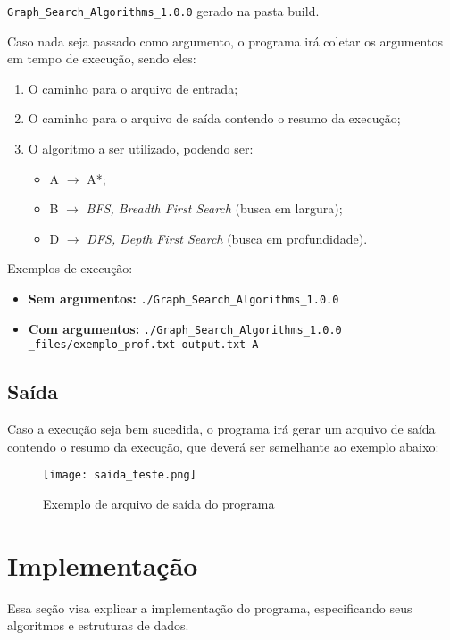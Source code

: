 \documentclass[12pt, a4paper]{article}
\begin{document}
\texttt{Graph\_Search\_Algorithms\_1.0.0} gerado na pasta build.

Caso nada seja passado como argumento, o programa irá coletar os argumentos em tempo de execução,
sendo eles:
\begin{enumerate}
    \item O caminho para o arquivo de entrada;
    \item O caminho para o arquivo de saída contendo o resumo da execução;
    \item O algoritmo a ser utilizado, podendo ser:
    \begin{itemize}
        \item A \( \rightarrow \) A*;
        \item B \( \rightarrow \) \textit{BFS, Breadth First Search} (busca em largura);
        \item D \( \rightarrow \) \textit{DFS, Depth First Search} (busca em profundidade).
    \end{itemize}
\end{enumerate}

Exemplos de execução:
\begin{itemize}
    \item\textbf{Sem argumentos:} \texttt{./Graph\_Search\_Algorithms\_1.0.0}
    \item\textbf{Com argumentos:} \texttt{./Graph\_Search\_Algorithms\_1.0.0\\_files/exemplo\_prof.txt output.txt A}
\end{itemize}

\subsection{Saída}\label{sec:saida}
Caso a execução seja bem sucedida, o programa irá gerar um arquivo de saída contendo o resumo da execução,
que deverá ser semelhante ao exemplo abaixo:
\begin{figure}[!h]
    \centering
    \texttt{[image: saida\_teste.png]}
    \caption{Exemplo de arquivo de saída do programa}
    \label{fig:saida_teste}
\end{figure}


\section{Implementação}\label{sec:impl}
Essa seção visa explicar a implementação do programa,
especificando seus algoritmos e estruturas de dados.
\end{document}
